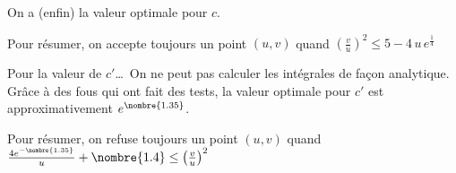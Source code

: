 On a (enfin) la valeur optimale pour $c$.

Pour résumer, on accepte toujours un point $(u, v)$ quand $\left(\frac{v}{u}\right)^2 \leq 5 - 4\,u\,e^{\frac{1}{4}}$

Pour la valeur de $c'$\dots\ On ne peut pas calculer les intégrales de façon analytique. Grâce à des fous qui ont fait des tests, la valeur optimale pour $c'$ est approximativement $e^{\nombre{1.35}}$.

Pour résumer, on refuse toujours un point $(u, v)$ quand $\frac{4e^{-\nombre{1.35}}}{u} + \nombre{1.4} \leq \left(\frac{v}{u}\right)^2$
